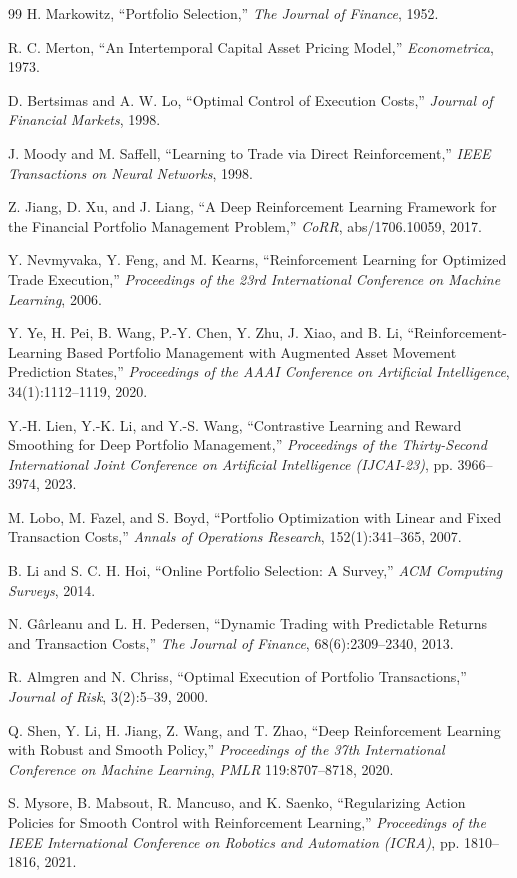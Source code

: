 \documentclass[10pt,twocolumn]{article}
\begin{document}
\begin{thebibliography}{99}
H. Markowitz, ``Portfolio Selection,'' \emph{The Journal of Finance}, 1952.

R. C. Merton, ``An Intertemporal Capital Asset Pricing Model,'' \emph{Econometrica}, 1973.

D. Bertsimas and A. W. Lo, ``Optimal Control of Execution Costs,'' \emph{Journal of Financial Markets}, 1998.

J. Moody and M. Saffell, ``Learning to Trade via Direct Reinforcement,'' \emph{IEEE Transactions on Neural Networks}, 1998.

Z. Jiang, D. Xu, and J. Liang, ``A Deep Reinforcement Learning Framework for the Financial Portfolio Management Problem,'' \emph{CoRR}, abs/1706.10059, 2017.

Y. Nevmyvaka, Y. Feng, and M. Kearns, ``Reinforcement Learning for Optimized Trade Execution,'' \emph{Proceedings of the 23rd International Conference on Machine Learning}, 2006.

Y. Ye, H. Pei, B. Wang, P.-Y. Chen, Y. Zhu, J. Xiao, and B. Li, ``Reinforcement-Learning Based Portfolio Management with Augmented Asset Movement Prediction States,'' \emph{Proceedings of the AAAI Conference on Artificial Intelligence}, 34(1):1112--1119, 2020.

Y.-H. Lien, Y.-K. Li, and Y.-S. Wang, ``Contrastive Learning and Reward Smoothing for Deep Portfolio Management,'' \emph{Proceedings of the Thirty-Second International Joint Conference on Artificial Intelligence (IJCAI-23)}, pp. 3966--3974, 2023.

M. Lobo, M. Fazel, and S. Boyd, ``Portfolio Optimization with Linear and Fixed Transaction Costs,'' \emph{Annals of Operations Research}, 152(1):341--365, 2007.

B. Li and S. C. H. Hoi, ``Online Portfolio Selection: A Survey,'' \emph{ACM Computing Surveys}, 2014.

N. G\^arleanu and L. H. Pedersen, ``Dynamic Trading with Predictable Returns and Transaction Costs,'' \emph{The Journal of Finance}, 68(6):2309--2340, 2013.

R. Almgren and N. Chriss, ``Optimal Execution of Portfolio Transactions,'' \emph{Journal of Risk}, 3(2):5--39, 2000.

Q. Shen, Y. Li, H. Jiang, Z. Wang, and T. Zhao, ``Deep Reinforcement Learning with Robust and Smooth Policy,'' \emph{Proceedings of the 37th International Conference on Machine Learning}, \emph{PMLR} 119:8707--8718, 2020.

S. Mysore, B. Mabsout, R. Mancuso, and K. Saenko, ``Regularizing Action Policies for Smooth Control with Reinforcement Learning,'' \emph{Proceedings of the IEEE International Conference on Robotics and Automation (ICRA)}, pp. 1810--1816, 2021.
\end{thebibliography}
\end{document}
